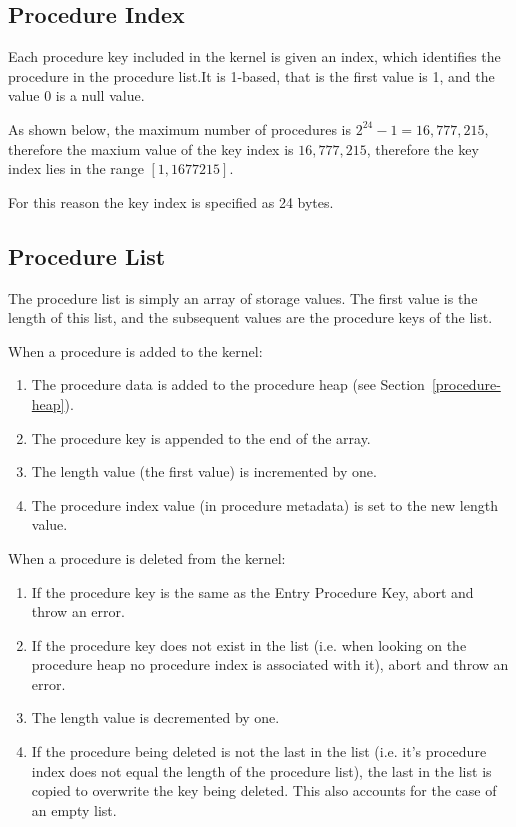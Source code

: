 \documentclass[english,a4paper]{article}
\begin{document}
\subsection{Procedure Index}
Each procedure key included in the kernel is given an index, which identifies
the procedure in the procedure list.It is 1-based, that is the first value is 1,
and the value 0 is a null value.

As shown below, the maximum number of procedures is $2^{24} - 1 = 16,777,215$,
therefore the maxium value of the key index is $16,777,215$, therefore the key
index lies in the range $\left[1,1677215\right]$.

For this reason the key index is specified as 24 bytes.

\subsection{Procedure List}\label{procedure-table}
The procedure list is simply an array of storage values. The first value is the
length of this list, and the subsequent values are the procedure keys of the
list.

When a procedure is added to the kernel:

\begin{enumerate}
  \item The procedure data is added to the procedure heap (see
  Section~\ref{procedure-heap}).
  \item The procedure key is appended to the end of the array.
  \item The length value (the first value) is incremented by one.
  \item The procedure index value (in procedure metadata) is set to the new
  length value.
\end{enumerate}

When a procedure is deleted from the kernel:

\begin{enumerate}
  \item If the procedure key is the same as the Entry Procedure Key, abort and
  throw an error.
  \item If the procedure key does not exist in the list (i.e. when looking on
  the procedure heap no procedure index is associated with it), abort and throw
  an error.
  \item The length value is decremented by one.
  \item If the procedure being deleted is not the last in the list (i.e. it's
  procedure index does not equal the length of the procedure list), the last in
  the list is copied to overwrite the key being deleted. This also accounts for
  the case of an empty list.
\end{enumerate}
\end{document}
